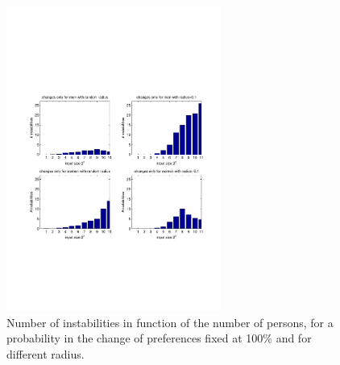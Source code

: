 \documentclass[11pt]{article}
\begin{document}
\begin{figure}[t]
	\includegraphics[trim=0 180 0 180, clip, height=10cm]{../figures/instability}
	\caption{Number of instabilities in function of the number of persons, for a 
  probability in the change of preferences fixed at 100\% and for different radius.}
	\label{fig:instability}
\end{figure}
\end{document}
